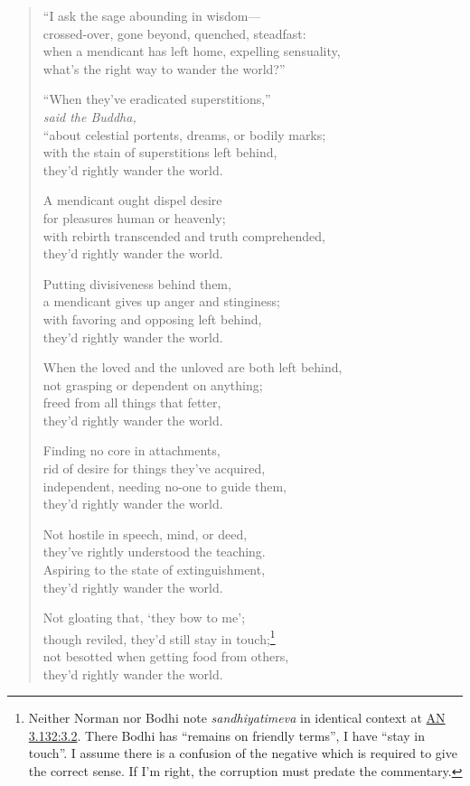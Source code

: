 \documentclass[12pt,openany]{book}%
\newcommand*{\scspeaker}[1]{\hspace{2em}\textit{#1}}
\begin{document}
\begin{verse}%
“I ask the sage abounding in wisdom—\\
crossed-over, gone beyond, quenched, steadfast: \\
when a mendicant has left home, expelling sensuality, \\
what’s the right way to wander the world?” 

“When they’ve eradicated superstitions,” \\
\scspeaker{said the Buddha, }\\
“about celestial portents, dreams, or bodily marks; \\
with the stain of superstitions left behind, \\
they’d rightly wander the world. 

A mendicant ought dispel desire \\
for pleasures human or heavenly; \\
with rebirth transcended and truth comprehended, \\
they’d rightly wander the world. 

Putting divisiveness behind them, \\
a mendicant gives up anger and stinginess; \\
with favoring and opposing left behind, \\
they’d rightly wander the world. 

When the loved and the unloved are both left behind, \\
not grasping or dependent on anything; \\
freed from all things that fetter, \\
they’d rightly wander the world. 

Finding no core in attachments, \\
rid of desire for things they’ve acquired, \\
independent, needing no-one to guide them, \\
they’d rightly wander the world. 

Not hostile in speech, mind, or deed, \\
they’ve rightly understood the teaching. \\
Aspiring to the state of extinguishment, \\
they’d rightly wander the world. 

Not gloating that, ‘they bow to me’; \\
though reviled, they’d still stay in touch;\footnote{Neither Norman nor Bodhi note \textit{sandhiyatimeva} in identical context at \href{https://suttacentral.net/an3.132/en/sujato\#3.2}{AN 3.132:3.2}. There Bodhi has “remains on friendly terms”, I have “stay in touch”. I assume there is a confusion of the negative which is required to give the correct sense. If I’m right, the corruption must predate the commentary. } \\
not besotted when getting food from others, \\
they’d rightly wander the world. 


\end{verse}
\end{document}
